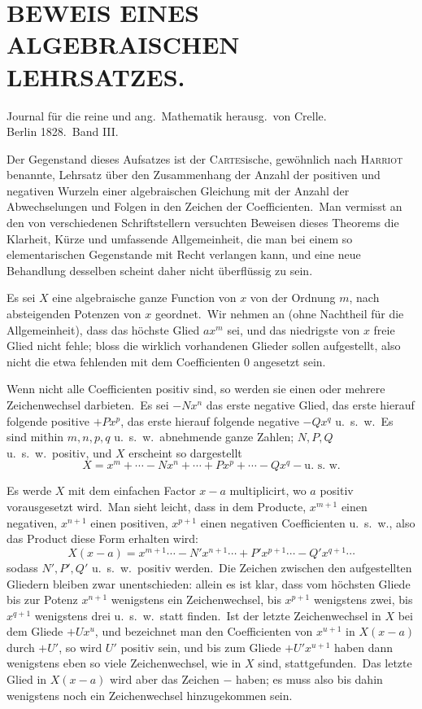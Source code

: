 \documentclass[12pt,a4paper]{article}
\theoremstyle{plain}
\begin{document}
\newpage
{}

\section*{BEWEIS EINES ALGEBRAISCHEN LEHRSATZES.}

Journal für die reine und ang.\ Mathematik herausg.\ von Crelle.\\
Berlin 1828.\ Band III.

\medskip

Der Gegenstand dieses Aufsatzes ist der \textsc{Cartes}ische, gewöhnlich nach \textsc{Harriot} benannte, Lehrsatz über den Zusammenhang der Anzahl der positiven und
negativen Wurzeln einer algebraischen Gleichung mit der Anzahl der Abwechselungen und Folgen in den Zeichen der Coefficienten.\ Man vermisst an den von
verschiedenen Schriftstellern versuchten Beweisen dieses Theorems die Klarheit,
Kürze und umfassende Allgemeinheit, die man bei einem so elementarischen Gegenstande mit Recht verlangen kann, und eine neue Behandlung desselben scheint
daher nicht überflüssig zu sein.

Es sei $X$ eine algebraische ganze Function von $x$ von der Ordnung $m$,
nach absteigenden Potenzen von $x$ geordnet.\ Wir nehmen an (ohne Nachtheil
für die Allgemeinheit), dass das höchste Glied $ax^m$ sei, und das niedrigste von $x$
freie Glied nicht fehle; bloss die wirklich vorhandenen Glieder sollen aufgestellt,
also nicht die etwa fehlenden mit dem Coefficienten $0$ angesetzt sein.

Wenn nicht alle Coefficienten positiv sind, so werden sie einen oder mehrere Zeichenwechsel darbieten.\ Es sei $-Nx^n$ das erste negative Glied, das erste hierauf folgende positive $+Px^p$, das erste hierauf folgende negative $-Qx^q$
u.\ s.\ w.\ Es sind mithin $m, n, p, q$ u.\ s.\ w.\ abnehmende ganze Zahlen; $N, P, Q$ u.\ s.\ w.\ positiv, und $X$ erscheint so dargestellt
\[
X = x^m + \cdots - Nx^n + \cdots + Px^p + \cdots - Qx^q - \text{u.\ s.\ w.}
\]

Es werde $X$ mit dem einfachen Factor $x - a$ multiplicirt, wo $a$ positiv
vorausgesetzt wird.\ Man sieht leicht, dass in dem Producte, $x^{m+1}$ einen negativen, $x^{n+1}$ einen positiven, $x^{p+1}$ einen negativen Coefficienten u.\ s.\ w., also das
Product diese Form erhalten wird:
\[
X(x-a) = x^{m+1} \cdots - N'x^{n+1} \cdots + P'x^{p+1} \cdots - Q'x^{q+1} \cdots
\]
sodass $N', P', Q'$ u.\ s.\ w.\ positiv werden.\ Die Zeichen zwischen den aufgestellten Gliedern bleiben zwar unentschieden: allein es ist klar, dass vom höchsten
Gliede bis zur Potenz $x^{n+1}$ wenigstens ein Zeichenwechsel, bis $x^{p+1}$ wenigstens
zwei, bis $x^{q+1}$ wenigstens drei u.\ s.\ w.\ statt finden.\ Ist der letzte Zeichenwechsel in $X$ bei dem Gliede $+Ux^u$, und bezeichnet man den Coefficienten von
$x^{u+1}$ in $X(x-a)$ durch $+U'$, so wird $U'$ positiv sein, und bis zum Gliede
$+U'x^{u+1}$ haben dann wenigstens eben so viele Zeichenwechsel, wie in $X$ sind,
stattgefunden.\ Das letzte Glied in $X(x-a)$ wird aber das Zeichen $-$ haben;
es muss also bis dahin wenigstens noch ein Zeichenwechsel hinzugekommen sein.
\end{document}
